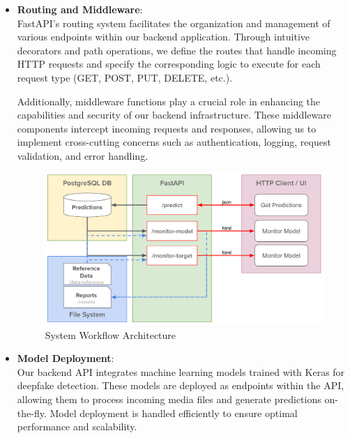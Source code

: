 \begin{itemize}
      \item \textbf{Routing and Middleware}:\\
            FastAPI's routing system facilitates the organization and management of various endpoints within our backend application. Through intuitive decorators and path operations, we define the routes that handle incoming HTTP requests and specify the corresponding logic to execute for each request type (GET, POST, PUT, DELETE, etc.).

            Additionally, middleware functions play a crucial role in enhancing the capabilities and security of our backend infrastructure. These middleware components intercept incoming requests and responses, allowing us to implement cross-cutting concerns such as authentication, logging, request validation, and error handling.

            \begin{figure}[htbp]
                  \centering
                  \includegraphics[width=6in]{img/image_2024-02-23_19-12-39.png}
                  \caption{System Workflow Architecture}
            \end{figure}

      \item \textbf{Model Deployment}:\\
            Our backend API integrates machine learning models trained with Keras for deepfake detection. These models are deployed as endpoints within the API, allowing them to process incoming media files and generate predictions on-the-fly. Model deployment is handled efficiently to ensure optimal performance and scalability.

\end{itemize}


\newpage